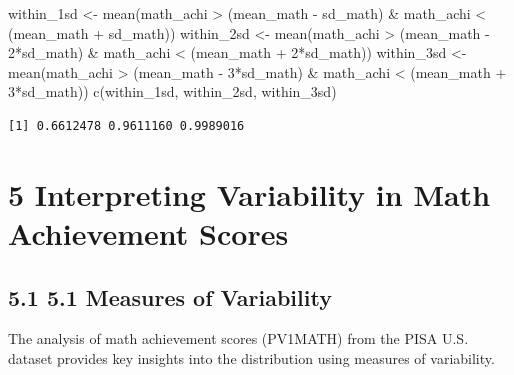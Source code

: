 \documentclass[
  letterpaper,
  DIV=11,
  numbers=noendperiod]{scrreprt}
\newenvironment{Shaded}{\begin{snugshade}}{\end{snugshade}}
\newcommand{\DecValTok}[1]{\textcolor[rgb]{0.68,0.00,0.00}{#1}}
\newcommand{\FunctionTok}[1]{\textcolor[rgb]{0.28,0.35,0.67}{#1}}
\newcommand{\NormalTok}[1]{\textcolor[rgb]{0.00,0.23,0.31}{#1}}
\newcommand{\OtherTok}[1]{\textcolor[rgb]{0.00,0.23,0.31}{#1}}
\newcommand{\SpecialCharTok}[1]{\textcolor[rgb]{0.37,0.37,0.37}{#1}}
\begin{document}
\begin{Shaded}
\begin{Highlighting}[]
\NormalTok{within\_1sd }\OtherTok{\textless{}{-}} \FunctionTok{mean}\NormalTok{(math\_achi }\SpecialCharTok{\textgreater{}}\NormalTok{ (mean\_math }\SpecialCharTok{{-}}\NormalTok{ sd\_math) }\SpecialCharTok{\&}\NormalTok{ math\_achi }\SpecialCharTok{\textless{}}\NormalTok{ (mean\_math }\SpecialCharTok{+}\NormalTok{ sd\_math)) }
\NormalTok{within\_2sd }\OtherTok{\textless{}{-}} \FunctionTok{mean}\NormalTok{(math\_achi }\SpecialCharTok{\textgreater{}}\NormalTok{ (mean\_math }\SpecialCharTok{{-}} \DecValTok{2}\SpecialCharTok{*}\NormalTok{sd\_math) }\SpecialCharTok{\&}\NormalTok{ math\_achi }\SpecialCharTok{\textless{}}\NormalTok{ (mean\_math }\SpecialCharTok{+} \DecValTok{2}\SpecialCharTok{*}\NormalTok{sd\_math)) }
\NormalTok{within\_3sd }\OtherTok{\textless{}{-}} \FunctionTok{mean}\NormalTok{(math\_achi }\SpecialCharTok{\textgreater{}}\NormalTok{ (mean\_math }\SpecialCharTok{{-}} \DecValTok{3}\SpecialCharTok{*}\NormalTok{sd\_math) }\SpecialCharTok{\&}\NormalTok{ math\_achi }\SpecialCharTok{\textless{}}\NormalTok{ (mean\_math }\SpecialCharTok{+} \DecValTok{3}\SpecialCharTok{*}\NormalTok{sd\_math)) }
\FunctionTok{c}\NormalTok{(within\_1sd, within\_2sd, within\_3sd) }
\end{Highlighting}
\end{Shaded}

\begin{verbatim}
[1] 0.6612478 0.9611160 0.9989016
\end{verbatim}

\section*{5 Interpreting Variability in Math Achievement
Scores}\label{interpreting-variability-in-math-achievement-scores}


\subsection*{5.1 5.1 Measures of
Variability}\label{measures-of-variability-1}

The analysis of math achievement scores (PV1MATH) from the PISA U.S.
dataset provides key insights into the distribution using measures of
variability.
\end{document}
